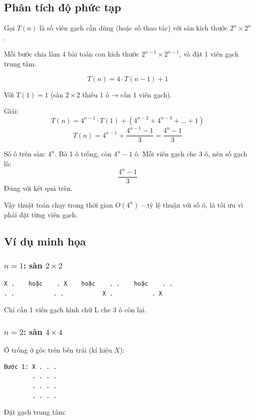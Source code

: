 \documentclass{article}
\begin{document}
\subsection{Phân tích độ phức tạp}

Gọi \(T(n)\) là số viên gạch cần dùng (hoặc số thao tác) với sàn kích thước \(2^n \times 2^n\).

Mỗi bước chia làm 4 bài toán con kích thước \(2^{n-1} \times 2^{n-1}\), và đặt 1 viên gạch trung tâm.

\[
T(n) = 4 \cdot T(n-1) + 1
\]

Với \(T(1) = 1\) (sàn \(2\times2\) thiếu 1 ô → cần 1 viên gạch).

Giải:
\[
T(n) = 4^{n-1} \cdot T(1) + (4^{n-2} + 4^{n-3} + \dots + 1)
\]
\[
T(n) = 4^{n-1} + \frac{4^{n-1} - 1}{3} = \frac{4^n - 1}{3}
\]

Số ô trên sàn: \(4^n\). Bỏ 1 ô trống, còn \(4^n - 1\) ô. Mỗi viên gạch che 3 ô, nên số gạch là:
\[
\frac{4^n - 1}{3}
\]
Đúng với kết quả trên.

Vậy thuật toán chạy trong thời gian \(O(4^n)\) – tỷ lệ thuận với số ô, là tối ưu vì phải đặt từng viên gạch.

\subsection{Ví dụ minh họa}

\subsubsection*{\(n = 1\): sàn \(2 \times 2\)}

\begin{verbatim}
X .    hoặc    . X    hoặc    . .    hoặc    . .
. .           . .           X .           . X
\end{verbatim}

Chỉ cần 1 viên gạch hình chữ L che 3 ô còn lại.

\subsubsection*{\(n = 2\): sàn \(4 \times 4\)}

Ô trống ở góc trên bên trái (kí hiệu \(X\)):

\begin{verbatim}
Bước 1: X . . .
        . . . .
        . . . .
        . . . .
\end{verbatim}

Đặt gạch trung tâm:
\end{document}
